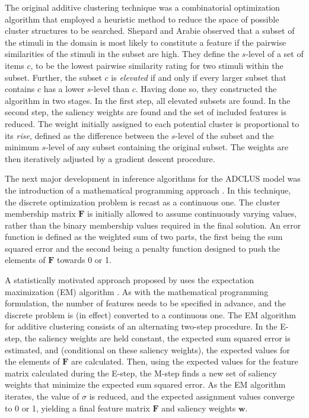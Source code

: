 \documentclass[11pt]{article}
\begin{document}
The original additive clustering technique \cite{sheparda79} was a combinatorial optimization algorithm that employed a heuristic method to reduce the space of possible cluster structures to be searched. Shepard and Arabie observed that a subset of the stimuli in the domain is most likely to constitute a feature if the pairwise similarities of the stimuli in the subset are high. They define the $s$-level of a set of items $c$, to be the lowest pairwise similarity rating for two stimuli within the subset. Further, the subset $c$ is {\it elevated} if and only if every larger subset that contains $c$ has a lower $s$-level than $c$. Having done so, they constructed the algorithm in two stages. In the first step, all elevated subsets are found. In the second step, the saliency weights are found and the set of included features is reduced. The weight initially assigned to each potential cluster is proportional to its {\it rise}, defined as the difference between the $s$-level of the subset and the minimum $s$-level of any subset containing the original subset. The weights are then iteratively adjusted by a gradient descent procedure.

The next major development in inference algorithms for the ADCLUS model was the introduction of a mathematical programming approach \cite{arabiec80}. In this technique, the discrete optimization problem is recast as a continuous one. The cluster membership matrix $\mathbf{F}$ is initially allowed to assume continuously varying values, rather than the binary membership values required in the final solution. An error function is defined as the weighted sum of two parts, the first being the sum squared error and the second being a penalty function designed to push the elements of $\mathbf{F}$ towards 0 or 1.

A statistically motivated approach proposed by  uses the expectation maximization (EM) algorithm \cite{dempsterlr77}. As with the mathematical programming formulation, the number of features needs to be specified in advance, and the discrete problem is (in effect) converted to a continuous one. The EM algorithm for additive clustering consists of an alternating two-step procedure. In the E-step, the saliency weights are held constant, the expected sum squared error is estimated, and (conditional on these saliency weights), the expected values for the elements of $\mathbf{F}$ are calculated. Then, using the expected values for the feature matrix calculated during the E-step, the M-step finds a new set of saliency weights that minimize the expected sum squared error. As the EM algorithm iterates, the value of $\sigma$ is reduced, and the expected assignment values converge to 0 or 1, yielding a final feature matrix $\mathbf{F}$ and saliency weights $\mathbf{w}$.
\end{document}
